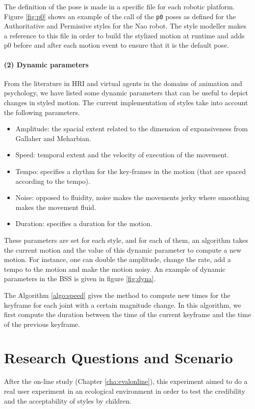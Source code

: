 \documentclass[smallextended]{svjour3}
\begin{document}
The definition of the pose is made in a specific file for each robotic platform.
Figure \ref{fig:p0} shows an example of the call of the \texttt{p0} poses as defined for the Authoritative and Permissive styles for the Nao robot. 
The style modeller makes a reference to this file in order to build the stylized motion at runtime and adds p0 before and after each motion event to ensure that it is the default pose.




\paragraph{(2) Dynamic parameters}
From the literature in HRI and virtual agents in the domains of animation and psychology, we have listed some dynamic parameters that can be useful to depict changes in styled motion.
The current implementation of styles take into account the following parameters. 

\begin{itemize}[noitemsep,nolistsep]
	\item Amplitude: the spacial extent related to the dimension of expansiveness from Gallaher and Meharbian.
	\item Speed: temporal extent and the velocity of execution of the movement.
	\item Tempo: specifies a rhythm for the key-frames in the motion (that are spaced according to the tempo).
	\item Noise: opposed to fluidity, noise makes the movements jerky where smoothing makes the movement fluid.
	\item Duration: specifies a duration for the motion.
\end{itemize}
These parameters are set for each style, and for each of them, an algorithm takes the current motion and the value of this dynamic parameter to compute a new motion.
For instance, one can double the amplitude, change the rate, add a tempo to the motion and make the motion noisy.
An example of dynamic parameters in the BSS is given in figure \ref{fig:dyna}.


The Algorithm \ref{algo:speed} gives the method to compute new times for the keyframe for each joint with a certain magnitude change.
In this algorithm, we first compute the duration between the time of the current keyframe and the time of the previous keyframe. 


\section{Research Questions and Scenario}\label{sec:research-questions-and-scenario}
After the on-line study (Chapter \ref{cha:evalonline}), this experiment aimed to do a real user experiment in an ecological environment in order to test the credibility and the acceptability of styles by children. 
\end{document}
